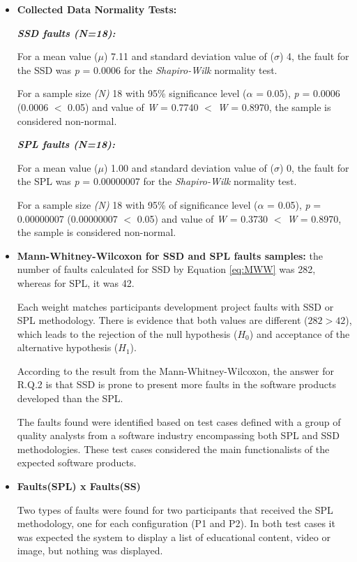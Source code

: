 \begin{itemize}
\setlength\itemsep{0.8em}

\item \textbf{Collected Data Normality Tests:} 

\textbf{\textit{SSD faults (\textit{N}=18):}}

For a mean value ($\mu$) 7.11 and standard deviation value of ($\sigma$) 4, the fault for the SSD was \textit{p} = 0.0006 for the \textit{Shapiro-Wilk} normality test.

For a sample size \textit{(N)} 18 with 95\% significance level ($\alpha$ = 0.05), \textit{p} = 0.0006 (0.0006 $<$ 0.05) and value of \textit{W} = 0.7740 $<$ \textit{W} = 0.8970, the sample is considered non-normal.

\textbf{\textit{SPL faults (\textit{N}=18):}}

For a mean value ($\mu$) 1.00 and standard deviation value of ($\sigma$) 0, the fault for the SPL was \textit{p} = 0.00000007 for the \textit{Shapiro-Wilk} normality test.

For a sample size \textit{(N)} 18 with 95\% of significance level ($\alpha$ = 0.05), \textit{p} = 0.00000007 (0.00000007 $<$ 0.05) and value of \textit{W} = 0.3730 $<$ \textit{W} = 0.8970, the sample is considered non-normal.

\item \textbf{Mann-Whitney-Wilcoxon for SSD and SPL faults samples:} the number of faults calculated for SSD by Equation \ref{eq:MWW} was 282, whereas for SPL, it was 42.

Each weight matches participants development project faults with SSD or SPL methodology. There is evidence that both values are different ($282>42$), which leads to the rejection of the null hypothesis ($H_0$) and acceptance of the alternative hypothesis ($H_{1}$).

According to the result from the Mann-Whitney-Wilcoxon, the answer for R.Q.2 is that SSD is prone to present more faults in the software products developed than the SPL. 

The faults found were identified based on test cases defined with a group of quality analysts from a software industry encompassing both SPL and SSD methodologies. These test cases considered the main functionalists of the expected software products. 

\item \textbf{Faults(SPL) x Faults(SS)}

Two types of faults were found for two participants that received the SPL methodology, one for each configuration (P1 and P2). In both test cases it was expected the system to display a list of educational content, video or image, but nothing was displayed. 


\end{itemize}
